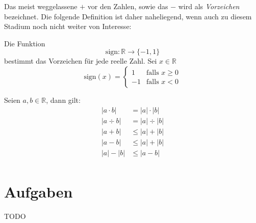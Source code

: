 Das meist weggelassene $+$ vor den Zahlen, sowie das $-$ wird als \emph{Vorzeichen} bezeichnet. Die folgende Definition ist daher naheliegend, wenn auch zu diesem Stadium noch nicht weiter von Interesse:

\begin{definition}
Die Funktion 
\[
\text{sign} : \mathbb{R} \longrightarrow \lbrace -1,1\rbrace
\]
bestimmt das Vorzeichen für jede reelle Zahl. Sei $x \in \mathbb{R}$
\begin{equation}
\text{sign}(x) = \begin{cases}
1 & \text{falls } x\ge 0 \\
-1 & \text{falls } x < 0
\end{cases}
\end{equation}
\end{definition}
Seien $a,b\in \mathbb{R}$, dann gilt:
\begin{equation}
\begin{split}
|a\cdot b| &= |a|\cdot |b| \\
|a\div b| &= |a|\div |b| \\
|a+b| &\le |a|+|b| \\
|a-b| &\le |a|+|b| \\
|a|-|b| &\le |a-b| \\
\end{split}
\end{equation}


\section{Aufgaben}
TODO
